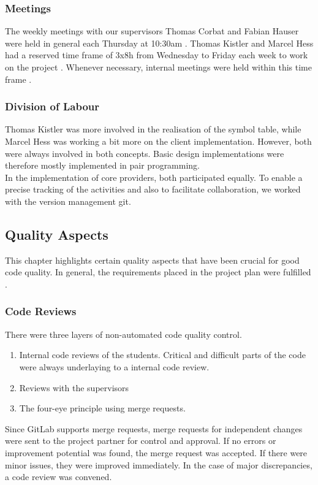 \subsubsection{Meetings}
The weekly meetings with our supervisors Thomas Corbat and Fabian Hauser were held in general each Thursday at 10:30am \cite{projectplan}.
Thomas Kistler and Marcel Hess had a reserved time frame of 3x8h from Wednesday to
Friday each week to work on the project \cite{projectplan}.
Whenever necessary, internal meetings were held within this time frame \cite{projectplan}.

\subsubsection{Division of Labour}
Thomas Kistler was more involved in the realisation of the symbol table,
while Marcel Hess was working a bit more on the client implementation.
However, both were always involved in both concepts.
Basic design implementations were therefore mostly implemented in pair programming.\\

In the implementation of core providers, both participated equally.
To enable a precise tracking of the activities and also to facilitate collaboration,
we worked with the version management git.

\subsection{Quality Aspects}
This chapter highlights certain quality aspects that have been crucial for good code quality.
In general, the requirements placed in the project plan were fulfilled \cite{projectplan}.

\subsubsection{Code Reviews}
There were three layers of non-automated code quality control.
\begin{enumerate}
    \item Internal code reviews of the students. Critical and difficult parts of the code were always underlaying to a internal code review.
    \item Reviews with the supervisors
    \item The four-eye principle using merge requests.
\end{enumerate}


Since GitLab supports merge requests,
merge requests for independent changes were sent to the project partner for control and approval.
If no errors or improvement potential was found, the merge request was accepted.
If there were minor issues, they were improved immediately.
In the case of major discrepancies, a code review was convened.


